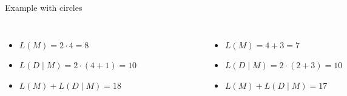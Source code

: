 \documentclass[10pt]{beamer}
\begin{document}
\begin{frame}{Example with circles}

    \begin{columns}[T, onlytextwidth]
            \begin{itemize}
                \item $L(M) = 2 \cdot 4 = 8$
                \item $L(D \mid M) = 2\cdot (4 + 1) = 10$
                \item $L(M) + L(D \mid M) = 18$
            \end{itemize}

        \begin{figure}
            \centering
            \includegraphics[scale=0.5]{figures/running-example/MDL/example-1.pdf}
        \end{figure}


            \begin{itemize}
                \item $L(M) = 4 + 3 = 7$
                \item $L(D \mid M) = 2\cdot (2 + 3) = 10$
                \item $L(M) + L(D \mid M) = 17$
            \end{itemize}


\end{columns}
\end{frame}
\end{document}
